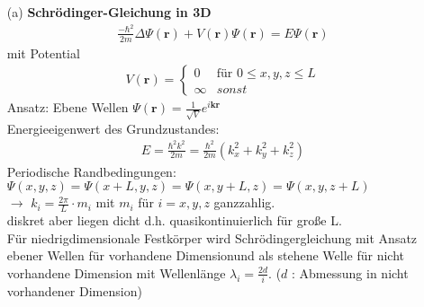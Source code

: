 \begin{itemize}
    \item [(a)] \textbf{Schrödinger-Gleichung in 3D} \\
        \begin{align}
            \frac{-\hbar^2}{2m} \Delta \Psi(\textbf{r}) + V(\textbf{r}) \Psi(\textbf{r}) = E \Psi(\textbf{r})
        \end{align}
        mit Potential
        \begin{align*}
            V(\textbf{r}) = \begin{cases}
                0 & \text{für } 0 \le x,y,z \le L\\
                \infty & sonst
            \end{cases}
        \end{align*}
        Ansatz: Ebene Wellen $ \Psi(\textbf{r}) = \frac{1}{\sqrt{V}} e^{i\textbf{kr}}$  \\
        Energieeigenwert des Grundzustandes:
        \begin{align}
            E = \frac{\hbar^2k^2}{2m} = \frac{\hbar^2}{2m}(k_x^2 + k_y^2 + k_z^2)
        \end{align}
        Periodische Randbedingungen:\\ $\Psi(x,y,z) = \Psi(x+L,y,z) = \Psi(x,y+L,z) = \Psi(x,y,z+L)$ \\
        $\rightarrow$ $k_i = \frac{2\pi}{L} \cdot m_i $ mit $m_i$ für $i =x,y,z$ ganzzahlig. \\
        diskret aber \glqq liegen dicht \grqq d.h. quasikontinuierlich für große L. \\
        Für niedrigdimensionale Festkörper wird Schrödingergleichung mit Ansatz ebener Wellen für \glqq vorhandene Dimension\grqq  und als stehene Welle für \glqq nicht vorhandene Dimension \grqq  mit Wellenlänge $ \lambda_i = \frac{2d}{i} $. ($d$ : Abmessung in nicht vorhandener Dimension) \\
        

\end{itemize}
